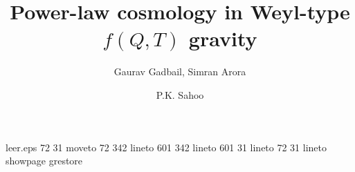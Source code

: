 %
%
%
%
\begin{filecontents}{leer.eps}
72 31 moveto
72 342 lineto
601 342 lineto
601 31 lineto
72 31 lineto
showpage
grestore
\end{filecontents}
%
\documentclass[epj]{svjour}
%
\usepackage{graphics}
\usepackage{bm}
\usepackage{amsfonts}
\usepackage{latexsym}
\usepackage[latin1]{inputenc}
\usepackage{graphicx}
\usepackage{amsmath}
\usepackage{palatino}
\usepackage{mathpazo}
\usepackage{textcomp}
\linespread{1.12}
\usepackage{float}
\usepackage{booktabs}
\usepackage{dcolumn}
\usepackage{ragged2e}
\usepackage{hyperref}
\hypersetup{colorlinks,citecolor=blue}
\usepackage{amsmath}
\usepackage{xcolor}
\usepackage{orcidlink}
\usepackage[caption=false]{subfig}
\usepackage{commath}
\captionsetup[subfigure]{labelformat=brace}
%

%
\title{Power-law cosmology in Weyl-type $f(Q,T)$ gravity}
\author{Gaurav Gadbail, Simran Arora \and P.K. Sahoo}%
%
%

